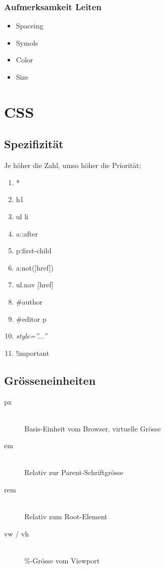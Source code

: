 \subsubsection{Aufmerksamkeit Leiten}

\begin{itemize}
	\item Spaceing
	\item Symols
	\item Color
	\item Size
\end{itemize}

\section{CSS}

\subsection{Spezifizität}

Je höher die Zahl, umso höher die Priorität;

\begin{enumerate}
	\item *
	\item h1
	\item ul li
	\item a::after
	\item p:first-child
	\item a:not([href])
	\item ul.nav [href]
	\item \#author
	\item \#editor p
	\item \emph{style=''...''}
	\item !important
\end{enumerate}

\subsection{Grösseneinheiten}

\begin{description}
	\item[px] \hfill \\
		Basis-Einheit vom Browser, virtuelle Grösse
	\item[em] \hfill \\
		Relativ zur Parent-Schriftgrösse
	\item[rem] \hfill \\
		Relativ zum Root-Element
	\item[vw / vh] \hfill \\
		\%-Grösse vom Viewport
\end{description}

